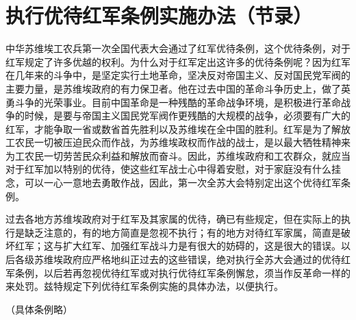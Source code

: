 \section[执行优待红军条例实施办法（节录）（一九三二年二月一日）]{执行优待红军条例实施办法（节录）}


中华苏维埃工农兵第一次全国代表大会通过了红军优待条例，这个优待条例，对于红军规定了许多优越的权利。为什么对于红军定出这许多的优待条例呢？因为红军在几年来的斗争中，是坚定实行土地革命，坚决反对帝国主义、反对国民党军阀的主要力量，是苏维埃政府的有力保卫者。他在过去中国的革命斗争历史上，做了英勇斗争的光荣事业。目前中国革命是一种残酷的革命战争环境，是积极进行革命战争的时候，是要与帝国主义国民党军阀作更残酷的大规模的战争，必须要有广大的红军，才能争取一省或数省首先胜利以及苏维埃在全中国的胜利。红军是为了解放工农民一切被压迫民众而作战，为苏维埃政权而作战的战士，是以最大牺牲精神来为工农民一切劳苦民众利益和解放而奋斗。因此，苏维埃政府和工农群众，就应当对于红军加以特别的优待，使这些红军战士心中得着安慰，对于家庭没有什么挂念，可以一心一意地去勇敢作战，因此，第一次全苏大会特别定出这个优待红军条例。

过去各地方苏维埃政府对于红军及其家属的优待，确已有些规定，但在实际上的执行是缺乏注意的，有的地方简直是忽视不执行；有的地方对待红军家属，简直是破坏红军；这与扩大红军、加强红军战斗力是有很大的妨碍的，这是很大的错误。以后各级苏维埃政府应严格地纠正过去的这些错误，绝对执行全苏大会通过的优待红军条例，以后若再忽视优待红军或对执行优待红军条例懈怠，须当作反革命一样的来处罚。兹特规定下列优待红军条例实施的具体办法，以便执行。

（具体条例略）

